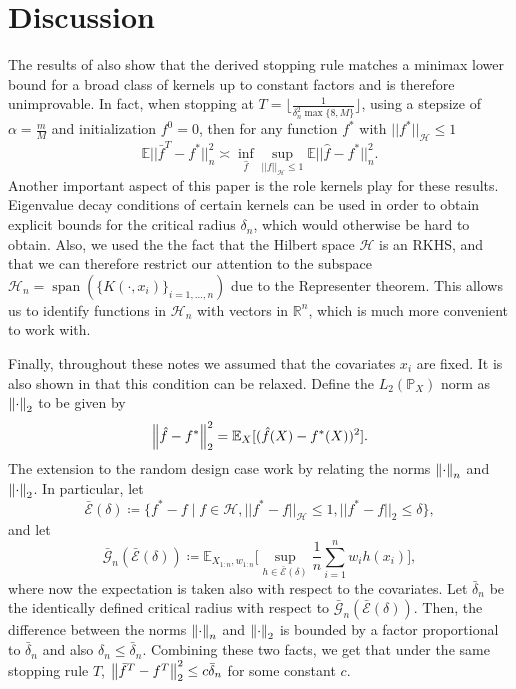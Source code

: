\section{Discussion}
The results of \cite{wei2017early} also show that the derived stopping rule matches a minimax lower bound for a broad class of kernels up to constant factors and is therefore unimprovable. In fact, when stopping at $T=\lfloor \frac{1}{\delta_n^2 \max\{8,M\}}\rfloor$, using a stepsize of $\alpha=\frac{m}{M}$ and initialization $f^0=0$, then for any function $f^*$ with $||f^*||_{\mathcal{H}}\le 1$
\begin{equation}
\mathbb{E}||\bar{f}^T-f^*||_n^2 \asymp \inf_{\hat{f}}\sup_{||f||_{\mathcal{H}}\le 1} \mathbb{E}||\hat{f}-f^*||_n^2.
\end{equation}
Another important aspect of this paper is the role kernels play for these results.
Eigenvalue decay conditions of certain kernels can be used in order to obtain explicit bounds for the critical radius $\delta_n$, which would otherwise be hard to obtain.
Also, we used the the fact that the Hilbert space $\mathcal{H}$ is an RKHS, and that we can therefore restrict our attention to the subspace $\mathcal{H}_n = \operatorname{span}(\{K(\cdot, x_i)\}_{i=1,...,n})$ due to the Representer theorem. This allows us to identify functions in $\mathcal{H}_n$ with vectors in $\mathbb{R}^n$, which is much more convenient to work with.

Finally, throughout these notes we assumed that the covariates $x_{i}$ are fixed.
It is also shown in \citet{wei2017early} that this condition can be relaxed.
Define the $L_{2}(\mathbb{P}_{X})$ norm as $\left\lVert\cdot\right\rVert_{2}$ to be given by
$$
\left\lVert\hat{f} - f^{*}\right\rVert_{2}^{2} = \mathbb{E}_{X}[(\hat{f}(X) - f^{*}(X))^{2}].
$$
The extension to the random design case work by relating the norms
$\left\lVert\cdot\right\rVert_{n}$
and $\left\lVert\cdot\right\rVert_{2}$.
In particular, let
$$
\bar{\mathcal{E}}(\delta) \coloneqq \{f^{*}-f \mid f\in\mathcal{H}, ||f^{*}-f||_{\mathcal{H}}\le 1, ||f^{*}-f||_2 \leq \delta\},
$$
and let
\begin{equation}
\bar{\mathcal{G}}_{n}(\bar{\mathcal{E}}(\delta)) \coloneqq
\mathbb{E}_{X_{1:n}, w_{1:n}}\Big[\sup_{h\in\bar{\mathcal{E}}(\delta)}\frac{1}{n}\sum_{i=1}^nw_ih(x_i)\Big],
\end{equation}
where now the expectation is taken also with respect to the covariates.
Let $\bar{\delta}_{n}$ be the identically defined critical radius with respect to
$\bar{\mathcal{G}}_{n}(\bar{\mathcal{E}}(\delta))$.
Then, the difference between the norms
$\left\lVert\cdot\right\rVert_{n}$
and $\left\lVert\cdot\right\rVert_{2}$ is bounded by a factor proportional to $\bar{\delta}_{n}$
and also $\delta_{n} \leq \bar{\delta}_{n}$. Combining these two facts, we get that
under the same stopping rule $T$, $\left\lVert\bar{f}^{T} - f^{T}\right\rVert_{2}^{2} \leq c \bar{\delta}_{n}$
for some constant $c$.

